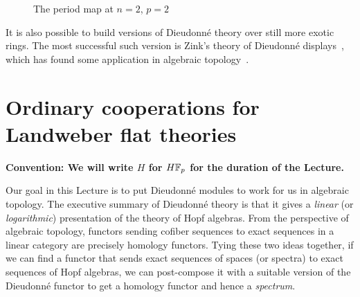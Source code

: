 \begin{figure}
\begin{center}
\end{center}
\caption{The period map at \(n = 2\), \(p = 2\)}\label{PeriodMapFigure}
\end{figure}

\begin{remark}
It is also possible to build versions of Dieudonn\'e theory over still more exotic rings.  The most successful such version is Zink's theory of Dieudonn\'e displays~\cite{ZinkDisplays}, which has found some application in algebraic topology~\cite{LawsonDisplays}.
\end{remark}









\section{Ordinary cooperations for Landweber flat theories}\label{LEFTCooperations}

\begin{center}
\textbf{Convention: We will write \(H\) for \(\HFp\) for the duration of the Lecture.}
\end{center}

Our goal in this Lecture is to put Dieudonn\'e modules to work for us in algebraic topology.  The executive summary of Dieudonn\'e theory is that it gives a \emph{linear} (or \emph{logarithmic}) presentation of the theory of Hopf algebras.  From the perspective of algebraic topology, functors sending cofiber sequences to exact sequences in a linear category are precisely homology functors.  Tying these two ideas together, if we can find a functor that sends exact sequences of spaces (or spectra) to exact sequences of Hopf algebras, we can post-compose it with a suitable version of the Dieudonn\'e functor to get a homology functor and hence a \emph{spectrum}.

